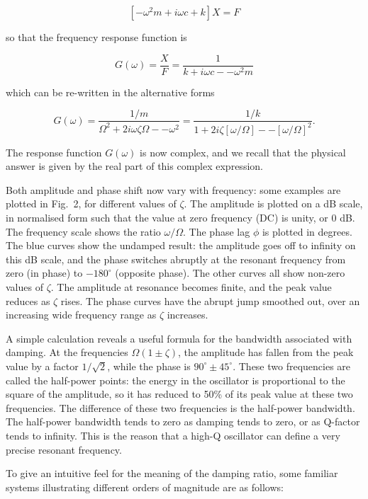   $$[-\omega^2 m + i \omega c +k]X=F \tag{9}$$ 

  so that the frequency response function is 

  $$G(\omega) = \frac{X}{F} = \frac{1}{k+i \omega c -- \omega^2 m} \tag{10} $$ 

  which can be re-written in the alternative forms 

  $$G(\omega) = \frac{1/m}{\Omega^2+2i \omega \zeta \Omega -- \omega^2 }= 
  \frac{1/k}{1+2i \zeta [\omega/\Omega] -- [\omega/\Omega]^2 }. \tag{11} $$ 

  The response function $G(\omega)$ is now complex, and we recall that the 
  physical answer is given by the real part of this complex expression. 



  Both amplitude and phase shift now vary with frequency: some examples are 
  plotted in Fig.\ 2, for different values of $\zeta$. The amplitude is plotted 
  on a dB scale, in normalised form such that the value at zero frequency (DC) 
  is unity, or 0 dB. The frequency scale shows the ratio $\omega/\Omega$. The 
  phase lag $\phi$ is plotted in degrees. The blue curves show the undamped 
  result: the amplitude goes off to infinity on this dB scale, and the phase 
  switches abruptly at the resonant frequency from zero (in phase) to 
  $-180^\circ$ (opposite phase). The other curves all show non-zero values of 
  $\zeta$. The amplitude at resonance becomes finite, and the peak value 
  reduces as $\zeta$ rises. The phase curves have the abrupt jump smoothed out, 
  over an increasing wide frequency range as $\zeta$ increases. 

  A simple calculation reveals a useful formula for the bandwidth associated 
  with damping. At the frequencies $\Omega(1 \pm \zeta)$, the amplitude has 
  fallen from the peak value by a factor $1/\sqrt{2}$, while the phase is 
  $90^\circ \pm 45^\circ$. These two frequencies are called the half-power 
  points: the energy in the oscillator is proportional to the square of the 
  amplitude, so it has reduced to 50\% of its peak value at these two 
  frequencies. The difference of these two frequencies is the half-power 
  bandwidth. The half-power bandwidth tends to zero as damping tends to zero, 
  or as Q-factor tends to infinity. This is the reason that a high-Q oscillator 
  can define a very precise resonant frequency. 

  To give an intuitive feel for the meaning of the damping ratio, some familiar 
  systems illustrating different orders of magnitude are as follows: 

